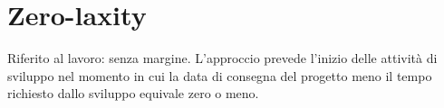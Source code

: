 	\section{Zero-laxity}
	\label{sec:zerolaxity}
	Riferito al lavoro: senza margine. L'approccio prevede l'inizio delle attività di sviluppo nel momento in cui la data di consegna del progetto meno il tempo richiesto dallo sviluppo equivale zero o meno. 
